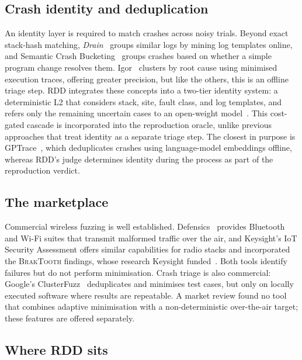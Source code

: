 \subsection{Crash identity and deduplication}

An identity layer is required to match crashes across noisy trials. Beyond exact
stack-hash matching, \emph{Drain}~\cite{drain2017} groups similar logs by mining log
templates online, and Semantic Crash Bucketing~\cite{scb2018} groups crashes based
on whether a simple program change resolves them. Igor~\cite{igor2021} clusters by
root cause using minimised execution traces, offering greater precision, but like
the others, this is an offline triage step. RDD integrates these concepts into a
two-tier identity system: a deterministic L2 that considers stack, site, fault
class, and log templates, and refers only the remaining uncertain cases to an
open-weight model~\cite{llama3_2024}. This cost-gated cascade is incorporated into
the reproduction oracle, unlike previous approaches that treat identity as a
separate triage step. The closest in purpose is GPTrace~\cite{gptrace2026}, which
deduplicates crashes using language-model embeddings offline, whereas RDD's judge
determines identity during the process as part of the reproduction verdict.

\subsection{The marketplace}

Commercial wireless fuzzing is well established. Defensics~\cite{defensics} provides
Bluetooth and Wi-Fi suites that transmit malformed traffic over the air, and
Keysight's IoT Security Assessment offers similar capabilities for radio stacks
and incorporated the \textsc{BrakTooth} findings, whose research Keysight
funded~\cite{keysightiot,keysightbraktooth2021,braktooth2022}. Both tools
identify failures but do not perform minimisation. Crash triage is also commercial:
Google's ClusterFuzz~\cite{clusterfuzz} deduplicates and minimises test cases, but
only on locally executed software where results are repeatable. A market review
found no tool that combines adaptive minimisation with a non-deterministic
over-the-air target; these features are offered separately.

\subsection{Where RDD sits}

